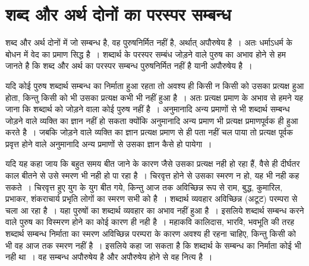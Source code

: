 \section*{शब्द और अर्थ दोनों का परस्पर सम्बन्ध}

शब्द और अर्थ दोनों में जो सम्बन्ध है, वह पुरुषनिर्मित नहीं है, अर्थात् अपौरुषेय है~। अतः धर्माऽधर्म के बोधन में वेद का प्रमाण सिद्ध है~। शब्दार्थ के परस्पर सम्बंध जोड़ने वाले पुरुष का अभाव होने से हम जानते है कि शब्द और अर्थ का परस्पर सम्बन्ध पुरुषनिर्मित नहीं है यानी अपौरुषेय है~।

यदि कोई पुरुष शब्दार्थ सम्बन्ध का निर्माता हुआ रहता तो अवश्य ही किसी न किसी को उसका प्रत्यक्ष हुआ होता, किन्तु किसी को भी उसका प्रत्यक्ष कभी भी नहीं हुआ है~। अतः प्रत्यक्ष प्रमाण के अभाव से हमने यह जाना कि शब्दार्थ को जोड़ने वाला कोई पुरुष नहीं है~। अनुमानादि अन्य प्रमाणों से भी शब्दार्थ सम्बन्ध जोड़ने वाले व्यक्ति का ज्ञान नहीं हो सकता क्योंकि अनुमानादि अन्य प्रमाण भी प्रत्यक्ष प्रमाणपूर्वक ही हुआ करते है~। जबकि जोड़ने वाले व्यक्ति का ज्ञान प्रत्यक्ष प्रमाण से ही पता नहीं चल पाया तो प्रत्यक्ष पूर्वक प्रवृत्त होने वाले अनुमानादि अन्य प्रमाणों से उसका ज्ञान कैसे हो पायेगा~।

\newpage

यदि यह कहा जाय कि बहुत समय बीत जाने के कारण जैसे उसका प्रत्यक्ष नही हो रहा हैं, वैसे ही दीर्घतर काल बीतने से उसे स्मरण भी नही हो पा रहा है~। चिरवृत्त होने से उसका स्मरण न हो, यह भी नही कह सकते~। चिरवृत्त हुए युग के युग बीत गये, किन्तु आज तक अविच्छिन्न रूप से राम, बुद्ध, कुमारिल, प्रभाकर, शंकराचार्य प्रभृति लोगों का स्मरण सभी को है~। शब्दार्थ व्यवहार अविच्छिन्न (अटूट) परम्परा से चला आ रहा है~। यहा पुरुषों का शब्दार्थ व्यवहार का अभाव नहीं हुआ है~। इसलिये शब्दार्थ सम्बन्ध करने वाले पुरुष का विस्मरण होने का कोई कारण ही नही है~। महाकवि कालिदास, भारवि, भवभूति की तरह शब्दार्थ सम्बन्ध निर्माता का स्मरण अविच्छिन्न परम्परा के कारण अवश्य ही रहना चाहिए, किन्तु किसी को भी वह आज तक स्मरण नहीं है~। इसलिये कहा जा सकता है कि शब्दार्थ के सम्बन्ध का निर्माता कोई भी नही था~। वह सम्बन्ध अपौरुषेय है और अपौरुषेय होने से वह नित्य है~। 

